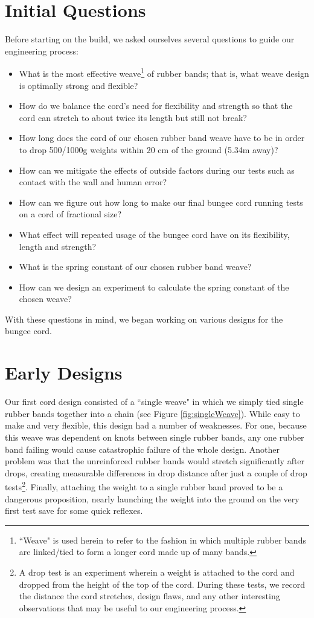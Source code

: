 \documentclass[12pt]{article}
\begin{document}
\section{Initial Questions}
Before starting on the build, we asked ourselves several questions to guide our engineering process:
\begin{itemize}
    \item What is the most effective weave\footnote{``Weave" is used herein to refer to the fashion in which multiple rubber bands are linked/tied to form a longer cord made up of many bands.} of rubber bands; that is, what weave design is optimally strong and flexible?
    \item How do we balance the cord's need for flexibility and strength so that the cord can stretch to about twice its length but still not break?
    \item How long does the cord of our chosen rubber band weave have to be in order to drop 500/1000g weights within 20 cm of the ground (5.34m away)?
    \item How can we mitigate the effects of outside factors during our tests such as contact with the wall and human error?
    \item How can we figure out how long to make our final bungee cord running tests on a cord of fractional size?
    \item What effect will repeated usage of the bungee cord have on its flexibility, length and strength?
    \item What is the spring constant of our chosen rubber band weave?
    \item How can we design an experiment to calculate the spring constant of the chosen weave?
\end{itemize}

With these questions in mind, we began working on various designs for the bungee cord.

\section{Early Designs}
Our first cord design consisted of a ``single weave" in which we simply tied single rubber bands together into a chain (see Figure \ref{fig:singleWeave}). While easy to make and very flexible, this design had a number of weaknesses. For one, because this weave was dependent on knots between single rubber bands, any one rubber band failing would cause catastrophic failure of the whole design. Another problem was that the unreinforced rubber bands would stretch significantly after drops, creating measurable differences in drop distance after just a couple of drop tests\footnote{A drop test is an experiment wherein a weight is attached to the cord and dropped from the height of the top of the cord. During these tests, we record the distance the cord stretches, design flaws, and any other interesting observations that may be useful to our engineering process.}. Finally, attaching the weight to a single rubber band proved to be a dangerous proposition, nearly launching the weight into the ground on the very first test save for some quick reflexes.
\newline
\end{document}
